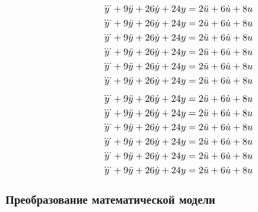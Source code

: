 \begin{equation}
	\notag
	\dddot{y} + 9\ddot{y} + 26\dot{y} + 24y = 2\ddot{u} + 6\dot{u} + 8u
\end{equation}
\begin{equation}
	\notag
	\dddot{y} + 9\ddot{y} + 26\dot{y} + 24y = 2\ddot{u} + 6\dot{u} + 8u
\end{equation}
\begin{equation}
	\notag
	\dddot{y} + 9\ddot{y} + 26\dot{y} + 24y = 2\ddot{u} + 6\dot{u} + 8u
\end{equation}
\begin{equation}
	\notag
	\dddot{y} + 9\ddot{y} + 26\dot{y} + 24y = 2\ddot{u} + 6\dot{u} + 8u
\end{equation}
\begin{equation}
	\notag
	\dddot{y} + 9\ddot{y} + 26\dot{y} + 24y = 2\ddot{u} + 6\dot{u} + 8u
\end{equation}
\begin{equation}
	\notag
	\dddot{y} + 9\ddot{y} + 26\dot{y} + 24y = 2\ddot{u} + 6\dot{u} + 8u
\end{equation}

\begin{equation}
	\notag
	\dddot{y} + 9\ddot{y} + 26\dot{y} + 24y = 2\ddot{u} + 6\dot{u} + 8u
\end{equation}
\begin{equation}
	\notag
	\dddot{y} + 9\ddot{y} + 26\dot{y} + 24y = 2\ddot{u} + 6\dot{u} + 8u
\end{equation}
\begin{equation}
	\notag
	\dddot{y} + 9\ddot{y} + 26\dot{y} + 24y = 2\ddot{u} + 6\dot{u} + 8u
\end{equation}\begin{equation}
	\notag
	\dddot{y} + 9\ddot{y} + 26\dot{y} + 24y = 2\ddot{u} + 6\dot{u} + 8u
\end{equation}
\begin{equation}
	\notag
	\dddot{y} + 9\ddot{y} + 26\dot{y} + 24y = 2\ddot{u} + 6\dot{u} + 8u
\end{equation}
\begin{equation}
	\notag
	\dddot{y} + 9\ddot{y} + 26\dot{y} + 24y = 2\ddot{u} + 6\dot{u} + 8u
\end{equation}


\subsubsection{Преобразование математической модели}

